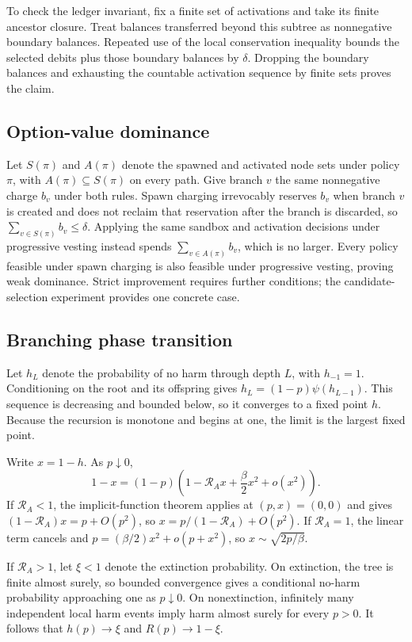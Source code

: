 \documentclass[sigconf,nonacm]{acmart}
\newcommand{\RA}{\mathcal{R}_{\!A}}
\begin{document}
To check the ledger invariant, fix a finite set of activations and take its finite ancestor
closure.  Treat balances transferred beyond this subtree as nonnegative boundary balances.
Repeated use of the local conservation inequality bounds the selected debits plus those boundary
balances by $\delta$.  Dropping the boundary balances and exhausting the countable activation
sequence by finite sets proves the claim.

\subsection{Option-value dominance}

Let $S(\pi)$ and $A(\pi)$ denote the spawned and activated node sets under policy $\pi$, with
$A(\pi)\subseteq S(\pi)$ on every path.  Give branch $v$ the same nonnegative charge $b_v$ under
both rules.  Spawn charging irrevocably reserves $b_v$ when branch $v$ is created and does not
reclaim that reservation after the branch is discarded, so
$\sum_{v\in S(\pi)}b_v\leq\delta$.  Applying the same sandbox and activation decisions under
progressive vesting instead spends $\sum_{v\in A(\pi)}b_v$, which is no larger.  Every policy
feasible under spawn charging is also feasible under progressive vesting, proving weak
dominance.  Strict improvement requires further conditions; the candidate-selection experiment
provides one concrete case.

\subsection{Branching phase transition}

Let $h_L$ denote the probability of no harm through depth $L$, with $h_{-1}=1$.  Conditioning on
the root and its offspring gives $h_L=(1-p)\psi(h_{L-1})$.  This sequence is decreasing and bounded
below, so it converges to a fixed point $h$.  Because the recursion is monotone and begins at one,
the limit is the largest fixed point.

Write $x=1-h$.  As $p\downarrow0$,
\[
1-x=(1-p)\left(1-\RA x+\frac{\beta}{2}x^2+o(x^2)\right).
\]
If $\RA<1$, the implicit-function theorem applies at $(p,x)=(0,0)$ and gives
$(1-\RA)x=p+O(p^2)$, so $x=p/(1-\RA)+O(p^2)$.  If $\RA=1$, the linear term cancels and
$p=(\beta/2)x^2+o(p+x^2)$, so $x\sim\sqrt{2p/\beta}$.

If $\RA>1$, let $\xi<1$ denote the extinction probability.  On extinction, the tree is finite
almost surely, so bounded convergence gives a conditional no-harm probability approaching one as
$p\downarrow0$.  On nonextinction, infinitely many independent local harm events imply harm
almost surely for every $p>0$.  It follows that $h(p)\to\xi$ and $R(p)\to1-\xi$.
\end{document}
